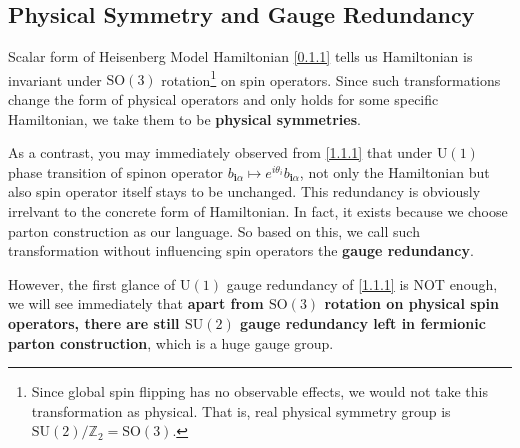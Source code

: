 \documentclass[10pt,nofootinbib]{revtex4}
\begin{document}
	\subsection{Physical Symmetry and Gauge Redundancy}
	Scalar form of Heisenberg Model Hamiltonian \eqref{0.1.1} tells us Hamiltonian is invariant under $\mathrm{SO}(3)$ rotation\footnote{Since global spin flipping has no observable effects, we would not take this transformation as physical. That is, real physical symmetry group is $\mathrm{SU}(2)/\mathbb{Z}_2=\mathrm{SO}(3)$.} on spin operators. Since such transformations change the form of physical operators and only holds for some specific Hamiltonian, we take them to be \textbf{physical symmetries}.\par
	As a contrast, you may immediately observed from \eqref{1.1.1} that under $\mathrm{U}(1)$ phase transition of spinon operator $b_{\bm{i}\alpha}\mapsto e^{i\theta_i}b_{\bm{i}\alpha}$, not only the Hamiltonian but also spin operator itself stays to be unchanged. This redundancy is obviously irrelvant to the concrete form of Hamiltonian. In fact, it exists because we choose parton construction as our language. So based on this, we call such transformation without influencing spin operators the \textbf{gauge redundancy}.\par
	However, the first glance of $\mathrm{U}(1)$ gauge redundancy of \eqref{1.1.1} is NOT enough, we will see immediately that \textbf{apart from $\mathrm{SO}(3)$ rotation on physical spin operators, there are still $\mathrm{SU}(2)$ gauge redundancy left in fermionic parton construction}, which is a huge gauge group.\par
\end{document}
